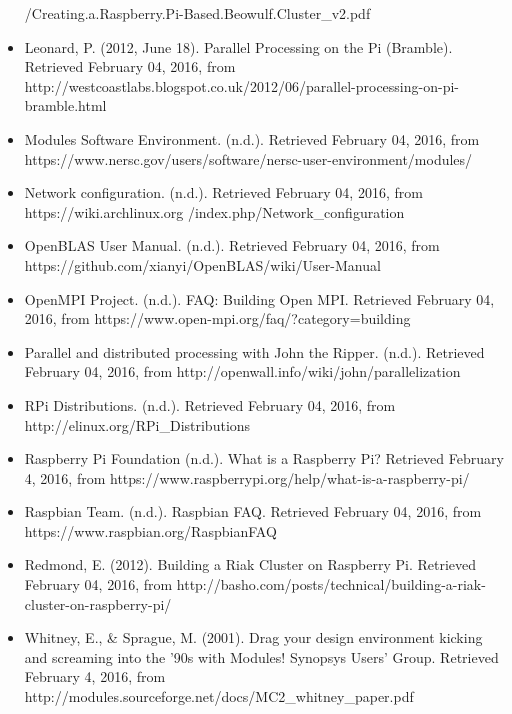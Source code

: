 \documentclass[]{article}
\begin{document}
\begin{itemize}
            /Creating.a.Raspberry.Pi-Based.Beowulf.Cluster\_v2.pdf
            \item Leonard, P. (2012, June 18). Parallel Processing on the Pi (Bramble). Retrieved February 04, 2016, from http://westcoastlabs.blogspot.co.uk/2012/06/parallel-processing-on-pi-bramble.html
            \item Modules Software Environment. (n.d.). Retrieved February 04, 2016, from https://www.nersc.gov/users/software/nersc-user-environment/modules/
            \item Network configuration. (n.d.). Retrieved February 04, 2016, from https://wiki.archlinux.org
            /index.php/Network\_configuration
            \item OpenBLAS User Manual. (n.d.). Retrieved February 04, 2016, from https://github.com/xianyi/OpenBLAS/wiki/User-Manual
            \item OpenMPI Project. (n.d.). FAQ: Building Open MPI. Retrieved February 04, 2016, from https://www.open-mpi.org/faq/?category=building
            \item Parallel and distributed processing with John the Ripper. (n.d.). Retrieved February 04, 2016, from http://openwall.info/wiki/john/parallelization
            \item RPi Distributions. (n.d.). Retrieved February 04, 2016, from 
            http://elinux.org/RPi\_Distributions
            \item Raspberry Pi Foundation (n.d.). What is a Raspberry Pi? Retrieved February 4, 2016, from https://www.raspberrypi.org/help/what-is-a-raspberry-pi/
            \item Raspbian Team. (n.d.). Raspbian FAQ. Retrieved February 04, 2016, from https://www.raspbian.org/RaspbianFAQ
            \item Redmond, E. (2012). Building a Riak Cluster on Raspberry Pi. Retrieved February 04, 2016, from http://basho.com/posts/technical/building-a-riak-cluster-on-raspberry-pi/
            \item Whitney, E., \& Sprague, M. (2001). Drag your design environment kicking and screaming into the '90s with Modules! Synopsys Users' Group. Retrieved February 4, 2016, from http://modules.sourceforge.net/docs/MC2\_whitney\_paper.pdf

            \end{itemize}

            
\end{document}
